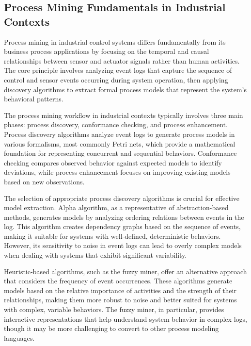 \subsection{Process Mining Fundamentals in Industrial Contexts}

Process mining in industrial control systems differs fundamentally from its business process applications by focusing on the temporal and causal relationships between sensor and actuator signals rather than human activities. The core principle involves analyzing event logs that capture the sequence of control and sensor events occurring during system operation, then applying discovery algorithms to extract formal process models that represent the system's behavioral patterns.

The process mining workflow in industrial contexts typically involves three main phases: process discovery, conformance checking, and process enhancement. Process discovery algorithms analyze event logs to generate process models in various formalisms, most commonly Petri nets, which provide a mathematical foundation for representing concurrent and sequential behaviors. Conformance checking compares observed behavior against expected models to identify deviations, while process enhancement focuses on improving existing models based on new observations.



The selection of appropriate process discovery algorithms is crucial for effective model extraction. Alpha algorithm, as a representative of abstraction-based methods, generates models by analyzing ordering relations between events in the log. This algorithm creates dependency graphs based on the sequence of events, making it suitable for systems with well-defined, deterministic behaviors. However, its sensitivity to noise in event logs can lead to overly complex models when dealing with systems that exhibit significant variability.

Heuristic-based algorithms, such as the fuzzy miner, offer an alternative approach that considers the frequency of event occurrences. These algorithms generate models based on the relative importance of activities and the strength of their relationships, making them more robust to noise and better suited for systems with complex, variable behaviors. The fuzzy miner, in particular, provides interactive representations that help understand system behavior in complex logs, though it may be more challenging to convert to other process modeling languages.


